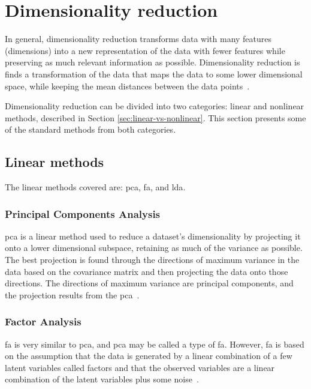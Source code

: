\section{Dimensionality reduction}\label{sec:dimensionality-reduction}
In general, dimensionality reduction transforms data with many features (dimensions) into a new representation of the data with fewer features while preserving as much relevant information as possible. Dimensionality reduction is finds a transformation of the data that maps the data to some lower dimensional space, while keeping the mean distances between the data points~\cite{dimensionality-reduction-comparative-review}.

Dimensionality reduction can be divided into two categories: linear and nonlinear methods, described in Section \ref{sec:linear-vs-nonlinear}. This section presents some of the standard methods from both categories.


\subsection{Linear methods}\label{subsec:linear-methods}
The linear methods covered are: \gls{pca}, \gls{fa}, and \gls{lda}.


\subsubsection{Principal Components Analysis}\label{subsubsec:principal-components-analysis}
\gls{pca} is a linear method used to reduce a dataset's dimensionality by projecting it onto a lower dimensional subspace, retaining as much of the variance as possible. The best projection is found through the directions of maximum variance in the data based on the covariance matrix and then projecting the data onto those directions. The directions of maximum variance are principal components, and the projection results from the \gls{pca}~\cite{dimensionality-reduction-comparative-review}.


\subsubsection{Factor Analysis}\label{subsubsec:factor-analysis}
\gls{fa} is very similar to \gls{pca}, and \gls{pca} may be called a type of \gls{fa}. However, \gls{fa} is based on the assumption that the data is generated by a linear combination of a few latent variables called factors and that the observed variables are a linear combination of the latent variables plus some noise~\cite{decoster-1998-factor-analysis-overview}.

